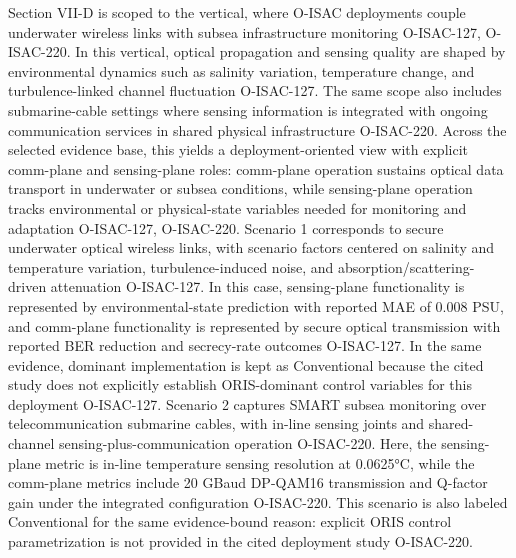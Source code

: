 {}Section VII-D is scoped to the  vertical, where O-ISAC deployments couple underwater wireless links with subsea infrastructure monitoring O-ISAC-127, O-ISAC-220. In this vertical, optical propagation and sensing quality are shaped by environmental dynamics such as salinity variation, temperature change, and turbulence-linked channel fluctuation O-ISAC-127. The same scope also includes submarine-cable settings where sensing information is integrated with ongoing communication services in shared physical infrastructure O-ISAC-220. Across the selected evidence base, this yields a deployment-oriented view with explicit comm-plane and sensing-plane roles: comm-plane operation sustains optical data transport in underwater or subsea conditions, while sensing-plane operation tracks environmental or physical-state variables needed for monitoring and adaptation O-ISAC-127, O-ISAC-220.\markdownRendererInterblockSeparator
{}
\markdownRendererSectionEnd \markdownRendererSectionBegin
{}\markdownRendererInterblockSeparator
{}Scenario 1 corresponds to secure underwater optical wireless links, with scenario factors centered on salinity and temperature variation, turbulence-induced noise, and absorption/scattering-driven attenuation O-ISAC-127. In this case, sensing-plane functionality is represented by environmental-state prediction with reported MAE of 0.008 PSU, and comm-plane functionality is represented by secure optical transmission with reported BER reduction and secrecy-rate outcomes O-ISAC-127. In the same evidence, dominant implementation is kept as Conventional because the cited study does not explicitly establish ORIS-dominant control variables for this deployment O-ISAC-127.\markdownRendererParagraphSeparator
{}Scenario 2 captures SMART subsea monitoring over telecommunication submarine cables, with in-line sensing joints and shared-channel sensing-plus-communication operation O-ISAC-220. Here, the sensing-plane metric is in-line temperature sensing resolution at 0.0625°C, while the comm-plane metrics include 20 GBaud DP-QAM16 transmission and Q-factor gain under the integrated configuration O-ISAC-220. This scenario is also labeled Conventional for the same evidence-bound reason: explicit ORIS control parametrization is not provided in the cited deployment study O-ISAC-220.\markdownRendererInterblockSeparator
{}
\markdownRendererSectionEnd \markdownRendererSectionBegin
{}\markdownRendererInterblockSeparator
